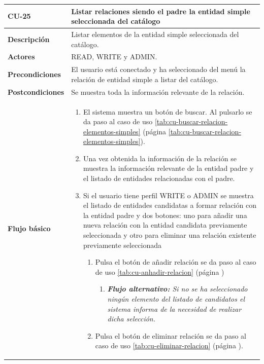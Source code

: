 \begin{table} [H]
    \centering
    \setlength{\leftmargini}{0.4cm}
	\resizebox{15cm}{!} { %
    \begin{tabular}{| m{3cm} | m{12cm} |}   
    \hline
	  \textbf{CU-25} & \textbf{Listar relaciones siendo el padre la entidad simple seleccionada del catálogo} \\\hline
	  \textbf{Descripción} & Listar elementos de la entidad simple seleccionada del catálogo. \\\hline
	  \textbf{Actores} & READ, WRITE y ADMIN. \\\hline
	  \textbf{Precondiciones} & El usuario está conectado y ha seleccionado del menú la relación de entidad simple a listar del catálogo. \\\hline
	  \textbf{Postcondiciones} & Se muestra toda la información relevante de la relación. \\\hline
	  \textbf{Flujo básico} & 
		\begin{enumerate}
	  	\item El sistema muestra un botón de buscar. Al pulsarlo se da paso al caso de uso \ref{tab:cu-buscar-relacion-elementos-simples} (página \ref{tab:cu-buscar-relacion-elementos-simples}).
	  	\item Una vez obtenida la información de la relación se muestra la información relevante de la entidad padre y el listado de entidades relacionadas con el padre.
	  	\item Si el usuario tiene perfil WRITE o ADMIN se muestra el listado de entidades candidatas a formar relación con la entidad padre y dos botones: uno para añadir una nueva relación con la entidad candidata previamente seleccionada y otro para eliminar una relación existente previamente seleccionada
	  	\begin{enumerate}
		        \item Pulsa el botón de añadir relación se da paso al caso de uso \ref{tab:cu-anhadir-relacion} (página \pageref{tab:cu-anhadir-relacion})
					\begin{enumerate}	
			   		\item  \textit{\textbf{Flujo alternativo:} Si no se ha seleccionado ningún elemento del listado de candidatos el sistema informa de la necesidad de realizar dicha selección.}
			   		\end{enumerate}		
		        \item Pulsa el botón de eliminar relación se da paso al caso de uso \ref{tab:cu-eliminar-relacion} (página \pageref{tab:cu-eliminar-relacion}).

\end{enumerate}
\end{enumerate}
\end{tabular}}
\end{table}

